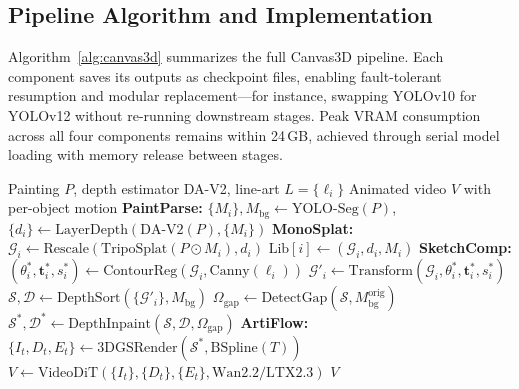 \subsection{Pipeline Algorithm and Implementation}
\label{sec:method:algo}

Algorithm~\ref{alg:canvas3d} summarizes the full Canvas3D pipeline. Each
component saves its outputs as checkpoint files, enabling fault-tolerant
resumption and modular replacement---for instance, swapping YOLOv10 for YOLOv12
without re-running downstream stages. Peak VRAM consumption across all four
components remains within 24\,GB, achieved through serial model loading with
memory release between stages.

\begin{algorithm}[t]
\caption{Canvas3D Pipeline}
\label{alg:canvas3d}
{\footnotesize
\begin{algorithmic}[1]
\REQUIRE Painting $P$, depth estimator DA-V2, line-art $L=\{\ell_i\}$
\ENSURE Animated video $V$ with per-object motion
\medskip
\STATE \textbf{PaintParse:}
    $\{M_i\}, M_\text{bg} \gets \text{YOLO-Seg}(P)$,
    $\{d_i\} \gets \text{LayerDepth}(\text{DA-V2}(P), \{M_i\})$
\STATE \textbf{MonoSplat:}
\STATE \quad $\mathcal{G}_i \gets \text{Rescale}(\text{TripoSplat}(P \odot M_i), d_i)$
\STATE \quad $\text{Lib}[i] \gets (\mathcal{G}_i, d_i, M_i)$
\ENDFOR
\STATE \textbf{SketchComp:}
\STATE \quad $(\theta_i^*,\mathbf{t}_i^*,s_i^*) \gets
    \text{ContourReg}(\mathcal{G}_i, \text{Canny}(\ell_i))$
\STATE \quad $\mathcal{G}'_i \gets \text{Transform}(\mathcal{G}_i, \theta_i^*,\mathbf{t}_i^*,s_i^*)$
\ENDFOR
\STATE $\mathcal{S},\mathcal{D} \gets \text{DepthSort}(\{\mathcal{G}'_i\}, M_\text{bg})$
\STATE $\Omega_\text{gap} \gets \text{DetectGap}(\mathcal{S}, M_\text{bg}^\text{orig})$
\STATE $\mathcal{S}^*,\mathcal{D}^* \gets \text{DepthInpaint}(\mathcal{S},\mathcal{D},\Omega_\text{gap})$
\STATE \textbf{ArtiFlow:}
    $\{I_t,D_t,E_t\} \gets \text{3DGSRender}(\mathcal{S}^*,\text{BSpline}(T))$
\STATE $V \gets \text{VideoDiT}(\{I_t\},\{D_t\},\{E_t\},\text{Wan2.2/LTX2.3})$
\RETURN $V$
\end{algorithmic}}
\end{algorithm}
